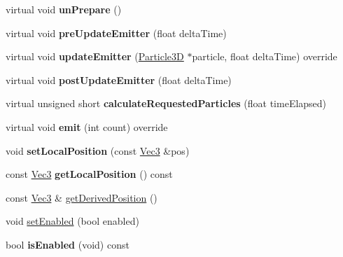 \begin{DoxyCompactItemize}
\mbox{\label{classPUEmitter_a0275c8931e46dc40568ea6ca50a0aa95}} 
virtual void {\bfseries un\+Prepare} ()
\item 
\mbox{\label{classPUEmitter_ae5b9baba041b8f968447c3242dfbbfdf}} 
virtual void {\bfseries pre\+Update\+Emitter} (float delta\+Time)
\item 
\mbox{\label{classPUEmitter_adf6af1d5c5242837f83d7e0e36fcde84}} 
virtual void {\bfseries update\+Emitter} (\hyperlink{structParticle3D}{Particle3D} $\ast$particle, float delta\+Time) override
\item 
\mbox{\label{classPUEmitter_a6c3a2aa817ca402fd2114ed8b79e5baf}} 
virtual void {\bfseries post\+Update\+Emitter} (float delta\+Time)
\item 
\mbox{\label{classPUEmitter_aeb5d5b0f82c7817edcbe514e02822218}} 
virtual unsigned short {\bfseries calculate\+Requested\+Particles} (float time\+Elapsed)
\item 
\mbox{\label{classPUEmitter_a0393c21ce6f049018499f3eb30000578}} 
virtual void {\bfseries emit} (int count) override
\item 
\mbox{\label{classPUEmitter_a3ce54a9192dca2a7ede165150eeddbb0}} 
void {\bfseries set\+Local\+Position} (const \hyperlink{classVec3}{Vec3} \&pos)
\item 
\mbox{\label{classPUEmitter_a115ef783e84aee1626dc20ddb4b43765}} 
const \hyperlink{classVec3}{Vec3} {\bfseries get\+Local\+Position} () const
\item 
const \hyperlink{classVec3}{Vec3} \& \hyperlink{classPUEmitter_a7021377a376b28f316ac4caf1412c0df}{get\+Derived\+Position} ()
\item 
void \hyperlink{classPUEmitter_a4f257171b370033d2ca3544867912645}{set\+Enabled} (bool enabled)
\item 
\mbox{\label{classPUEmitter_a3fba3a4ea416f98e87092c56ae7d2a66}} 
bool {\bfseries is\+Enabled} (void) const
\item 
\mbox{\label{classPUEmitter_ab123febe49418c9c012315c87410b6b8}} 

\end{DoxyCompactItemize}
